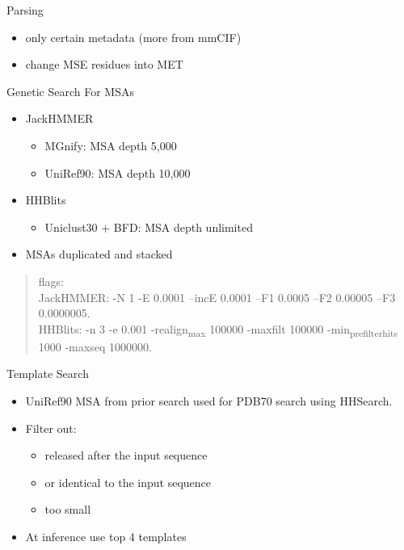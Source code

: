 \documentclass[presentation, smaller]{beamer}
\begin{document}
\begin{frame}[label={sec:orgd39b98e}]{Parsing \cite{jumperHighlyAccurateProtein2021}}
\begin{itemize}
\item only certain metadata (more from mmCIF)
\item change MSE residues into MET
\end{itemize}
\end{frame}

\begin{frame}[label={sec:orgdc961c2}]{Genetic Search \cite{jumperHighlyAccurateProtein2021}}
For MSAs
\begin{itemize}
\item JackHMMER
\begin{itemize}
\item MGnify: MSA depth 5,000
\item UniRef90: MSA depth 10,000
\end{itemize}
\item HHBlits
\begin{itemize}
\item Uniclust30 + BFD: MSA depth unlimited
\end{itemize}
\item MSAs duplicated and stacked
\end{itemize}

\begin{quote}
flags: \\
  JackHMMER: -N 1 -E 0.0001 --incE 0.0001 --F1 0.0005 --F2 0.00005 --F3 0.0000005. \\
  HHBlits: -n 3 -e 0.001 -realign\textsubscript{max} 100000 -maxfilt 100000 -min\textsubscript{prefilter}\textsubscript{hits} 1000 -maxseq 1000000.
\end{quote}
\end{frame}

\begin{frame}[label={sec:org8f9d465}]{Template Search \cite{jumperHighlyAccurateProtein2021}}
\begin{itemize}
\item UniRef90 MSA from prior search used for PDB70 search using HHSearch.
\item Filter out:
\begin{itemize}
\item released after the input sequence
\item or identical to the input sequence
\item too small
\end{itemize}
\item At inference use top 4 templates
\end{itemize}
\end{frame}
\end{document}
